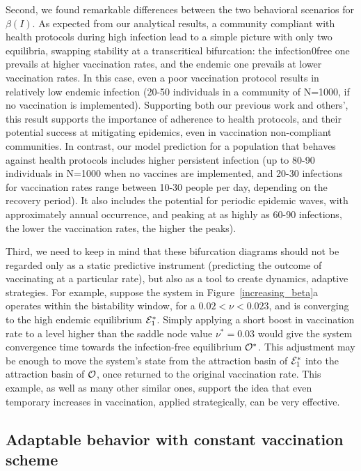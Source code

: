\documentclass[10pt]{article}
\begin{document}
Second, we found remarkable differences between the two behavioral scenarios for $\beta(I)$. As expected from our analytical results, a community compliant with health protocols during high infection lead to a simple picture with only two equilibria, swapping stability at a transcritical bifurcation: the infection0free one prevails at higher vaccination rates, and the endemic one prevails at lower vaccination rates. In this case, even a poor vaccination protocol results in relatively low endemic infection (20-50 individuals in a community of N=1000, if no vaccination is implemented). Supporting both our previous work and others', this result supports the importance of adherence to health protocols, and their potential success at mitigating epidemics, even in vaccination non-compliant communities. In contrast, our model prediction for a population that behaves against health protocols includes higher persistent infection (up to 80-90 individuals in N=1000 when no vaccines are implemented, and 20-30 infections for vaccination rates range between 10-30 people per day, depending on the recovery period). It also includes the potential for periodic epidemic waves, with approximately annual occurrence, and peaking at as highly as 60-90 infections, the lower the vaccination rates, the higher the peaks).

Third, we need to keep in mind that these bifurcation diagrams should not be regarded only as a static predictive instrument (predicting the outcome of vaccinating at a particular rate), but also as a tool to create dynamics, adaptive strategies. For example, suppose the system in 
Figure~\ref{increasing_beta}a operates within the bistability window, for a  $0.02<\nu<0.023$, and is converging to the high endemic equilibrium ${\cal E}^*_1$. Simply applying a short boost in vaccination rate to a level higher than the saddle node value $\nu^*=0.03$ would give the system convergence time towards the infection-free equilibrium ${\cal O}^*$. This adjustment may be enough to move the system's state from the attraction basin of ${\cal E}^*_1$ into the attraction basin of ${\cal O}$, once returned to the original vaccination rate. This example, as well as many other similar ones, support the idea that even temporary increases in vaccination, applied strategically, can be very effective.



\subsection{Adaptable behavior with constant vaccination scheme}
\quad
\end{document}

